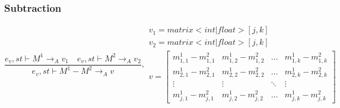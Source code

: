 \subsubsection{Subtraction}
\begin{equation}
	\frac { { e }_{ v },st\vdash { M }^{ 1 }{ \rightarrow  }_{ A }{ v }_{ 1 }\quad { e }_{ v },st\vdash { M }^{ 2 }{ \rightarrow  }_{ A }{ v }_{ 2 } }{ { e }_{ v },st\vdash { M }^{ 1 }-{ M }^{ 2 }{ \rightarrow  }_{ A }{ v } } ,\begin{matrix} { v }_{ 1 }=matrix<int|float>[j,k] \\ { v }_{ 2 }=matrix<int|float>[j,k] \\ v=\begin{bmatrix} { { m }_{ 1,1 }^{ 1 } } - { { m }_{ 1,1 }^{ 2 } } & { { m }_{ 1,2 }^{ 1 } } - { { m }_{ 1,2 }^{ 2 } } & \dots  & { m }_{ 1,k }^{ 1 } - { { m }_{ 1,k }^{ 2} } \\
{ { m }_{ 2,1 }^{ 1 } } - { { m }_{ 2,1 }^{ 2 } } &  { { m }_{ 2,2 }^{ 1 } } - { { m }_{ 2,2 }^{ 2 } } & \dots & { { m }_{ 2,k }^{ 1 } }  - { { m }_{ 2,k }^{ 2 } }
\\ \vdots  & \vdots & \ddots  & \vdots \\
 { m }_{ j,1 }^{ 1 } - { { m }_{ j,1 }^{ 2 } } & { { m }_{ j,2 }^{ 1 } } - { { m }_{ j,2 }^{ 2 } }  & \dots & { m }_{ j,k }^{ 1 } - { { m }_{ j,k }^{ 2 } } \end{bmatrix} \end{matrix}
\end{equation}


